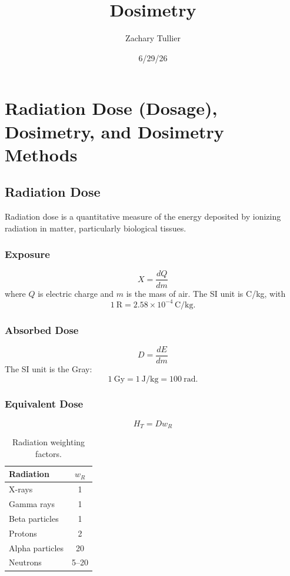 \documentclass[12pt]{article}
\title{Dosimetry}
\author{Zachary Tullier}
\date{6/29/26}
\begin{document}
\maketitle
\section{Radiation Dose (Dosage), Dosimetry, and Dosimetry Methods}

\subsection{Radiation Dose}
Radiation dose is a quantitative measure of the energy deposited by ionizing radiation in matter, particularly biological tissues.

\subsubsection{Exposure}
\begin{equation}
X=\frac{dQ}{dm}
\end{equation}
where $Q$ is electric charge and $m$ is the mass of air. The SI unit is C/kg, with
\[
1~\mathrm{R}=2.58\times10^{-4}\,\mathrm{C/kg}.
\]

\subsubsection{Absorbed Dose}
\begin{equation}
D=\frac{dE}{dm}
\end{equation}
The SI unit is the Gray:
\[
1~\mathrm{Gy}=1~\mathrm{J/kg}=100~\mathrm{rad}.
\]

\subsubsection{Equivalent Dose}
\begin{equation}
H_T=Dw_R
\end{equation}

\begin{table}[h]
\centering
\begin{tabular}{lc}
\hline
Radiation & $w_R$\\ \hline
X-rays & 1\\
Gamma rays & 1\\
Beta particles & 1\\
Protons & 2\\
Alpha particles & 20\\
Neutrons & 5--20\\
\hline
\end{tabular}
\caption{Radiation weighting factors.}
\end{table}
\end{document}
